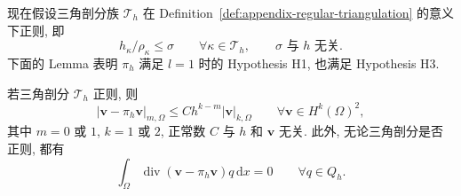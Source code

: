 现在假设三角剖分族 $\mathcal{T}_h$ 在
Definition~\ref{def:appendix-regular-triangulation} 的意义下正则, 即
\begin{equation}\label{eq:primitive-triangulation-regularity}
h_\kappa/\rho_\kappa\leq\sigma
\qquad\forall\kappa\in\mathcal{T}_h,
\qquad \sigma\text{ 与 }h\text{ 无关}.
\end{equation}
下面的 Lemma 表明 $\pi_h$ 满足 $l=1$ 时的 Hypothesis H1, 也满足
Hypothesis H3.

\setcounter{statement}{1}
\begin{Lemma}\label{lem:primitive-bernardi-raugel-fortin-estimates}
若三角剖分 $\mathcal{T}_h$ 正则, 则
\begin{equation}\label{eq:primitive-bernardi-raugel-interpolation-estimate}
|\mathbf v-\pi_h\mathbf v|_{m,\Omega}
\leq Ch^{k-m}|\mathbf v|_{k,\Omega}
\qquad\forall\mathbf v\in H^k(\Omega)^2,
\end{equation}
其中 $m=0$ 或 $1$, $k=1$ 或 $2$, 正常数 $C$ 与 $h$ 和
$\mathbf v$ 无关. 此外, 无论三角剖分是否正则, 都有
\begin{equation}\label{eq:primitive-bernardi-raugel-divergence-orthogonality}
\int_\Omega\operatorname{div}(\mathbf v-\pi_h\mathbf v)q\,\mathrm dx=0
\qquad\forall q\in Q_h.
\end{equation}
\end{Lemma}


